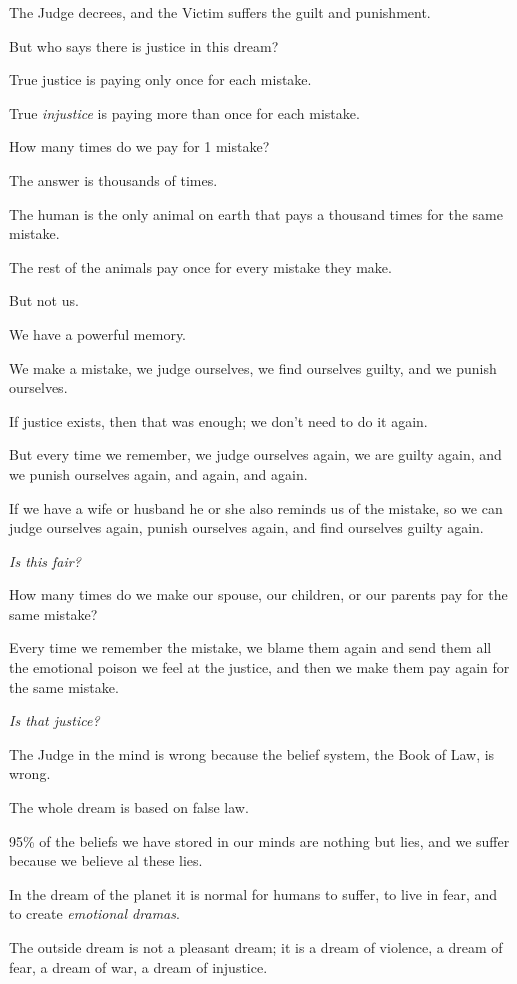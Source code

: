 \documentclass{article}
\numberwithin{equation}{section}
\begin{document}
The Judge decrees, and the Victim suffers the guilt and punishment.

But who says there is justice in this dream?

True justice is paying only once for each mistake.

True \textit{injustice} is paying more than once for each mistake.

%
How many times do we pay for 1 mistake?

The answer is thousands of times.

The human is the only animal on earth that pays a thousand times for the same mistake.

The rest of the animals pay once for every mistake they make.

But not us.

We have a powerful memory.

We make a mistake, we judge ourselves, we find ourselves guilty, and we punish ourselves.

If justice exists, then that was enough; we don't need to do it again.

But every time we remember, we judge ourselves again, we are guilty again, and we punish ourselves again, and again, and again.

If we have a wife or husband he or she also reminds us of the mistake, so we can judge ourselves again, punish ourselves again, and find ourselves guilty again.

\textit{Is this fair?}

%
How many times do we make our spouse, our children, or our parents pay for the same mistake?

Every time we remember the mistake, we blame them again and send them all the emotional poison we feel at the justice, and then we make them pay again for the same mistake.

\textit{Is that justice?}

The Judge in the mind is wrong because the belief system, the Book of Law, is wrong.

The whole dream is based on false law.

95\% of the beliefs we have stored in our minds are nothing but lies, and we suffer because we believe al these lies.

%
In the dream of the planet it is normal for humans to suffer, to live in fear, and to create \textit{emotional dramas}.

The outside dream is not a pleasant dream; it is a dream of violence, a dream of fear, a dream of war, a dream of injustice.
\end{document}
